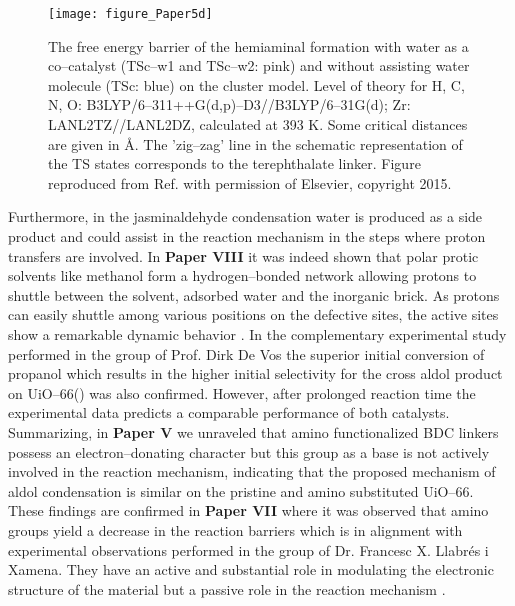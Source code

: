 \begin{figure}[!htp]
	\centering
	\texttt{[image: figure\_Paper5d]}
	\caption[The free energy barrier of the hemiaminal formation with water as a
	co--catalyst (TSc--w1 and TSc--w2: pink) and without assisting water molecule
	(TSc: blue) on the cluster model. Level of theory for H, C, N, O: B3LYP/6--311++G(d,p)--D3//B3LYP/6--31G(d); Zr:
	LANL2TZ//LANL2DZ, calculated at 393 K. Some critical distances are given in \AA. The 'zig--zag'
	line in the schematic representation of the TS states corresponds to the
	terephthalate linker.]{The free energy barrier of the hemiaminal
	formation with water as a co--catalyst (TSc--w1 and TSc--w2: pink) and without assisting water molecule
	(TSc: blue) on the cluster model. Level of theory for H, C, N, O: B3LYP/6--311++G(d,p)--D3//B3LYP/6--31G(d); Zr:
	LANL2TZ//LANL2DZ, calculated at 393 K. Some critical distances are given in \AA. The 'zig--zag'
	line in the schematic representation of the TS states corresponds to the
	terephthalate linker. Figure reproduced from Ref. \cite{Hajek2015} with
	permission of Elsevier, copyright 2015.}
		\label{fig:figure_Paper5d}
\end{figure}
\npar
Furthermore, in the jasminaldehyde condensation
water is produced as a side product and could assist in the reaction mechanism
in the steps where proton transfers are involved. In \textbf{Paper VIII} it was
indeed shown that polar protic solvents like methanol form a
hydrogen--bonded network allowing protons to shuttle between the solvent,
adsorbed water and the inorganic brick. As protons can easily shuttle among
various positions on the defective sites, the active sites show a remarkable
dynamic behavior \cite{Caratelli2017a}.
\npar
In the complementary experimental study performed in the group of Prof. Dirk
De Vos the superior initial conversion of propanol which results in the
higher initial selectivity for the cross aldol product on UiO--66() was
also confirmed. However, after prolonged reaction time the experimental data predicts a comparable performance of both catalysts.
\npar
Summarizing, in \textbf{Paper V} we unraveled that amino functionalized BDC
linkers possess an electron--donating character but this group as a base is not
actively involved in the reaction mechanism, indicating that the proposed mechanism of aldol condensation is similar on the
pristine and amino substituted UiO--66.
\npar
These findings are confirmed in \textbf{Paper VII} where it was observed that
amino groups yield a decrease in the reaction barriers which is in alignment
with experimental observations performed in  the group of Dr. Francesc X.
Llabr\'es i Xamena. They have an active and substantial role in modulating the
electronic structure of the material but a passive role in the reaction
mechanism \cite{Caratelli2017}.


